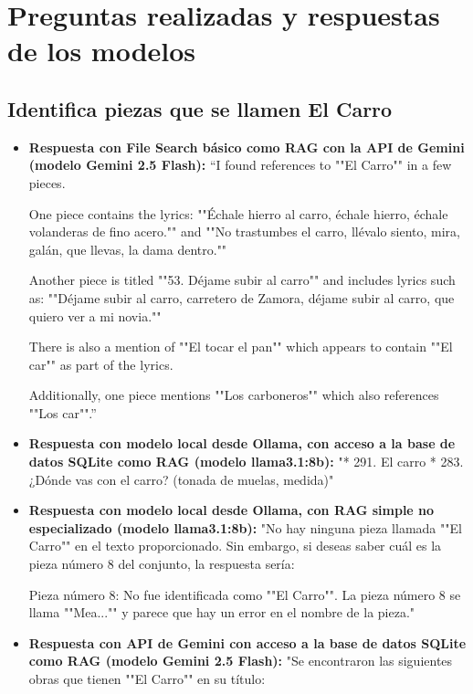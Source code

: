 \chapter{Preguntas realizadas y respuestas de los modelos}
\label{Appendix:Key2}

\section{Identifica piezas que se llamen El Carro}
\begin{itemize}
    \item \textbf{Respuesta con File Search básico como RAG con la API de Gemini (modelo Gemini 2.5 Flash):} ``I found references to ""El Carro"" in a few pieces.

One piece contains the lyrics: ""Échale hierro al carro, échale hierro, échale volanderas de fino acero."" and ""No trastumbes el carro, llévalo siento, mira, galán, que llevas, la dama dentro.""

Another piece is titled ""53. Déjame subir al carro"" and includes lyrics such as: ""Déjame subir al carro, carretero de Zamora, déjame subir al carro, que quiero ver a mi novia.""

There is also a mention of ""El tocar el pan"" which appears to contain ""El car"" as part of the lyrics.

Additionally, one piece mentions ""Los carboneros"" which also references ""Los car"".''
    \item \textbf{Respuesta con modelo local desde Ollama, con acceso a la base de datos SQLite como RAG (modelo llama3.1:8b):} "* 291. El carro
* 283. ¿Dónde vas con el carro? (tonada de muelas, medida)"
    \item \textbf{Respuesta con modelo local desde Ollama, con RAG simple no especializado (modelo llama3.1:8b):} "No hay ninguna pieza llamada ""El Carro"" en el texto proporcionado. Sin embargo, si deseas saber cuál es la pieza número 8 del conjunto, la respuesta sería:

Pieza número 8: No fue identificada como ""El Carro"". La pieza número 8 se llama ""Mea..."" y parece que hay un error en el nombre de la pieza."
    \item \textbf{Respuesta con API de Gemini con acceso a la base de datos SQLite como RAG (modelo Gemini 2.5 Flash):} "Se encontraron las siguientes obras que tienen ""El Carro"" en su título:


\end{itemize}
